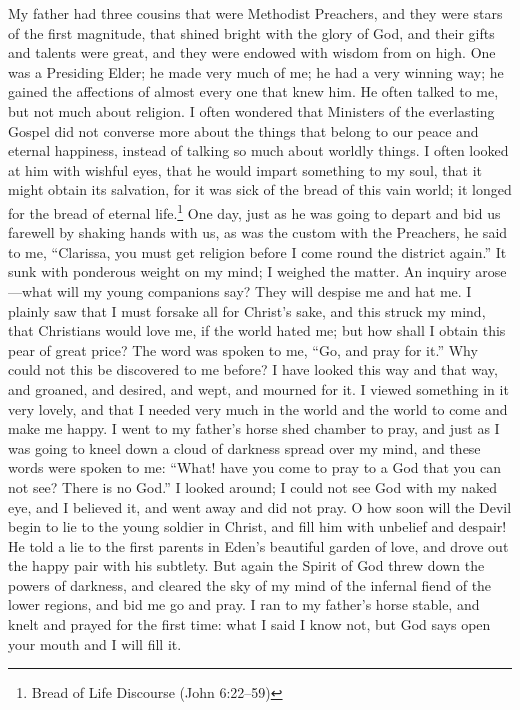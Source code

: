My father had three cousins that were Methodist Preachers, and they were stars of the first magnitude, that shined bright with the glory of God, and their gifts and talents were great, and they were endowed with wisdom from on high.
One was a Presiding Elder; he made very much of me; he had a very winning way; he gained the affections of almost every one that knew him.
He often talked to me, but not much about religion.
I often wondered that Ministers of the everlasting Gospel did not converse more about the things that belong to our peace and eternal happiness, instead of talking so much about worldly things.
I often looked at him with wishful eyes, that he would impart something to my soul, that it might obtain its salvation, for it was sick of the bread of this vain world; it longed for the bread of eternal life.\footnote{Bread of Life Discourse (John 6:22--59)}
One day, just as he was going to depart and bid us farewell by shaking hands with us, as was the custom with the Preachers, he said to me, ``Clarissa, you must get religion before I come round the district again.''
It sunk with ponderous weight on my mind; I weighed the matter.
An inquiry arose---what will my young companions say?
They will despise me and hat me.
I plainly saw that I must forsake all for Christ's sake, and this struck my mind, that Christians would love me, if the world hated me; but how shall I obtain this pear of great price?
The word was spoken to me, ``Go, and pray for it.''
Why could not this be discovered to me before?
I have looked this way and that way, and groaned, and desired, and wept, and mourned for it.
I viewed something in it very lovely, and that I needed very much in the world and the world to come and make me happy.
I went to my father's horse shed chamber to pray, and just as I was going to kneel down a cloud of darkness spread over my mind, and these words were spoken to me: ``What! have you come to pray to a God that you can not see? There is no God.''
I looked around; I could not see God with my naked eye, and I believed it, and went away and did not pray.
O how soon will the Devil begin to lie to the young soldier in Christ, and fill him with unbelief and despair!
He told a lie to the first parents in Eden's beautiful garden of love, and drove out the happy pair with his subtlety.
But again the Spirit of God threw down the powers of darkness, and cleared the sky of my mind of the infernal fiend of the lower regions, and bid me go and pray.
I ran to my father's horse stable, and knelt and prayed for the first time: what I said I know not, but God says open your mouth and I will fill it.
